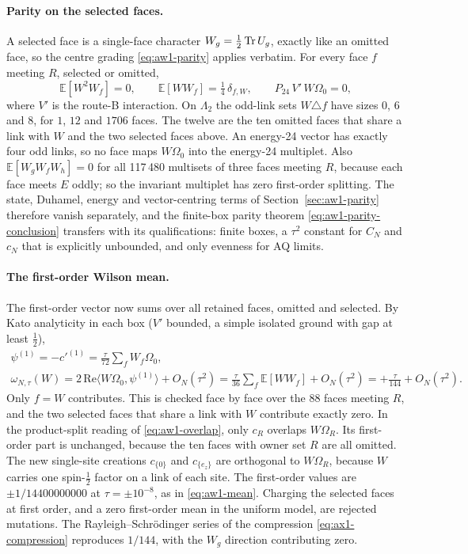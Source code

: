 \paragraph{Parity on the selected faces.}
A selected face is a single-face character $W_g=\tfrac12\operatorname{Tr} U_g$, exactly
like an omitted face, so the centre grading \eqref{eq:aw1-parity} applies
verbatim. For every face $f$ meeting $R$, selected or omitted,
\begin{equation}
 \mathbb E[W^2W_f]=0,\qquad \mathbb E[WW_f]=\tfrac14\,\delta_{f,W},\qquad
 P_{24}\,V'\,W\Omega_0=0 ,
 \label{eq:ax1-parity}
\end{equation}
where $V'$ is the route-B interaction. On $\Lambda_2$ the odd-link sets
$W\triangle f$ have sizes $0$, $6$ and $8$, for $1$, $12$ and $1706$ faces.
The twelve are the ten omitted faces that share a link with $W$ and the two
selected faces above. An energy-24 vector has exactly four odd links, so no
face maps $W\Omega_0$ into the energy-24 multiplet. Also
$\mathbb E[W_gW_fW_h]=0$ for all 117\,480 multisets of three faces meeting
$R$, because each face meets $E$ oddly; so the invariant multiplet has zero
first-order splitting. The state, Duhamel, energy and vector-centring terms of
Section~\ref{sec:aw1-parity} therefore vanish separately, and the finite-box
parity theorem \eqref{eq:aw1-parity-conclusion} transfers with its
qualifications: finite boxes, a $\tau^2$ constant for $C_N$ and $c_N$ that is
explicitly unbounded, and only evenness for AQ limits.

\paragraph{The first-order Wilson mean.}
The first-order vector now sums over all retained faces, omitted and selected.
By Kato analyticity in each box ($V'$ bounded, a simple isolated ground with
gap at least $\tfrac12$),
\begin{equation}
 \begin{gathered}
 \psi^{(1)}=-c'^{(1)}=\frac\tau{72}\sum_fW_f\Omega_0,\\
 \omega_{N,\tau}(W)=2\,\mathrm{Re}\langle W\Omega_0,\psi^{(1)}\rangle+O_N(\tau^2)
 =\frac\tau{36}\sum_f\mathbb E[WW_f]+O_N(\tau^2)
 =+\frac\tau{144}+O_N(\tau^2).
 \end{gathered}
 \label{eq:ax1-mean}
\end{equation}
Only $f=W$ contributes. This is checked face by face over the 88 faces meeting
$R$, and the two selected faces that share a link with $W$ contribute exactly
zero. In the product-split reading of \eqref{eq:aw1-overlap}, only $c_R$
overlaps $W\Omega_R$. Its first-order part is unchanged, because the ten faces
with owner set $R$ are all omitted. The new single-site creations
$c_{\{0\}}$ and $c_{\{e_z\}}$ are orthogonal to $W\Omega_R$, because $W$
carries one spin-$\tfrac12$ factor on a link of each site. The first-order
values are $\pm1/14400000000$ at $\tau=\pm10^{-8}$, as in
\eqref{eq:aw1-mean}. Charging the selected faces at first order, and a zero
first-order mean in the uniform model, are rejected mutations. The
Rayleigh--Schr\"odinger series of the compression \eqref{eq:ax1-compression}
reproduces $1/144$, with the $W_g$ direction contributing zero.

